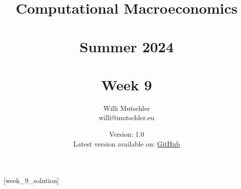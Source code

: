 
\newif\ifDisplaySolutions%


\title{Computational Macroeconomics\\~\\Summer 2024\\~\\Week 9}
\author{Willi Mutschler\\willi@mutschler.eu}
\date{Version: 1.0\\Latest version available on: \href{https://github.com/wmutschl/Computational-Macroeconomics/releases/latest/download/week_9.pdf}{GitHub}}
\maketitle\thispagestyle{empty}

\newpage
{}[week_9_solution]
\tableofcontents\thispagestyle{empty}\newpage

\setcounter{page}{1}
\newpage
\newpage
\newpage

\printbibliography%

\newpage

\ifDisplaySolutions%
\newpage
\appendix
\section{Solutions}

\fi
